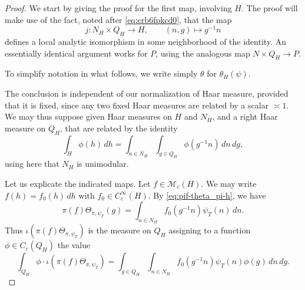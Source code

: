 \begin{proof}
  We start by giving the proof for the first map, involving $H$.  The proof will make use of the fact, noted after \eqref{eq:crb6fpkcd0}, that the map
  \begin{equation*}
    j: N_H \times Q_H \rightarrow H,
    \qquad
    (n, g) \mapsto g^{-1} n
  \end{equation*}
  defines a local analytic isomorphism in some neighborhood of the identity.  An essentially identical argument works for $P$, using the analogous map $N \times Q_H \rightarrow P$.

  To simplify notation in what follows, we write simply $\theta$ for $\theta_H(\psi)$.

  The conclusion is independent of our normalization of Haar measure, provided that it is fixed, since any two fixed Haar measures are related by a scalar $\asymp 1$.  We may thus suppose given Haar measures on $H$ and $N_H$, and a right Haar measure on $Q_H$, that are related by the identity
  \begin{equation}\label{eq:int-_h-phih}
    \int_{H} \phi(h) \, d h
    =
    \int_{n \in N_H}
    \int_{g \in Q_H} \phi(g^{-1} n) \, d n \, d g,
  \end{equation}
  using here that $N_H$ is unimodular.

  Let us explicate the indicated maps.  Let $f \in \mathcal{M}_c(H)$.  We may write $f(h) = f_0(h) \, d h$ with $f_0 \in C_c^\infty(H)$.  By \eqref{eq:pif-theta_pi-h}, we have
  \begin{equation*}
    \pi(f) \Theta_{\pi,\psi_T}(g) =  \int_{n \in N_H} f_0(g^{-1} n ) \psi_T(n) \, d n.
  \end{equation*}
  Thus $\iota(\pi(f) \Theta_{\pi,\psi_T})$ is the measure on $Q_H$ assigning to a function $\phi \in C_c(Q_H)$ the value
  \begin{equation}\label{eq:int-_q_h-phi}
    \int_{Q_H} \phi \cdot \iota(\pi(f) \Theta_{\pi,\psi_T})
    =
    \int_{g \in Q_H}
    \int_{n \in N_H}
    f_0(g^{-1} n) \psi_T(n) \phi(g)
    \, d n
    \, d g.
  \end{equation}


\end{proof}
